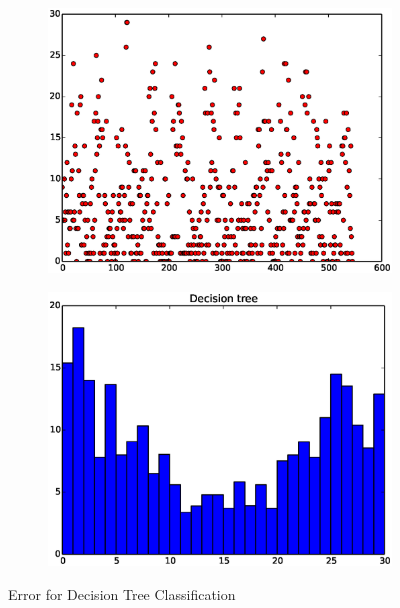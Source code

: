 \documentclass{article}
\begin{document}
\begin{figure}[H]
  \begin{subfigure}[!h]{0.5\textwidth}
    \centering
    \includegraphics[width=\textwidth]{./woodley/Decision_tree_heading_plot.eps}
    \label{img:woodley_sample}
  \end{subfigure}
  \begin{subfigure}[!h]{0.5\textwidth}
    \centering
    \includegraphics[width=\textwidth]{./woodley/Decision_tree_heading_bar.eps}
    \label{img:woodley_features}
  \end{subfigure}
  \caption{Error for Decision Tree Classification}
\end{figure}
\end{document}
